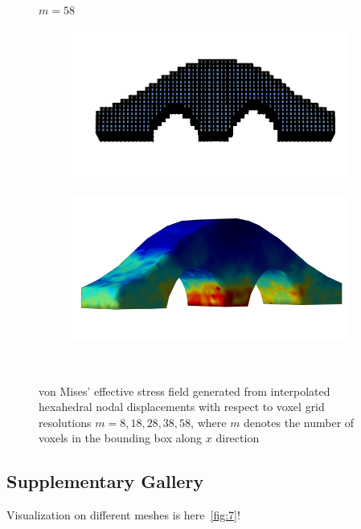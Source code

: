 \documentclass[11pt,titlepage]{article}
\begin{document}
\begin{figure}[!htbp]
        \begin{center}
        $m=58$
        \quad
        \begin{subfigure}[b]{0.4\textwidth}
            \centering
            \includegraphics[width=\textwidth]{hex/resized/archbridge_cage_5}
        \end{subfigure}
        \begin{subfigure}[b]{0.35\textwidth}
            \centering
            \includegraphics[width=\textwidth]{hex/resized/archbridge_5}
        \end{subfigure}\\ 

        \caption{\label{fig:6} von Mises' effective stress field generated from interpolated hexahedral nodal displacements with respect to voxel grid resolutions $m=8, 18, 28, 38, 58$, where     $m$ denotes the number of voxels in the bounding box along $x$ direction}
    \end{center}
\end{figure}


\subsection{Supplementary Gallery}
Visualization on different meshes is here~\ref{fig:7}!
\end{document}
